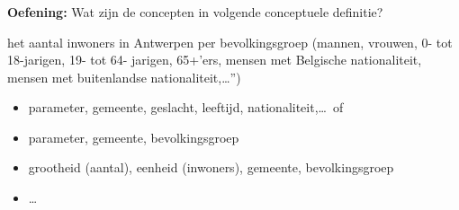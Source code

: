 \documentclass{beamer}
\begin{document}
\begin{frame}
\frametitle{}
\vfill
\begin{small}\color{softsteelblue} 
\textbf{Oefening:} Wat zijn de concepten in volgende conceptuele definitie?
\end{small}
\par
\smallskip
\par 
\begin{scriptsize} 
het aantal inwoners in Antwerpen per bevolkingsgroep (mannen, vrouwen, 0- tot 18-jarigen, 19- tot 64- jarigen, 65+'ers, mensen met Belgische nationaliteit, mensen met buitenlandse nationaliteit,\ldots'')
\end{scriptsize}
\par
\vfill
\par
\begin{small}\color{softsteelblue}
\end{small}
\par
\smallskip
\par
\begin{itemize}\scriptsize
\item<2-> parameter, gemeente, geslacht, leeftijd, nationaliteit,\ldots\ of
\item<3-> parameter, gemeente, bevolkingsgroep
\item<4-> grootheid (aantal), eenheid (inwoners), gemeente, bevolkingsgroep
\item<5-> \ldots
\end{itemize}
\end{frame}
\end{document}
